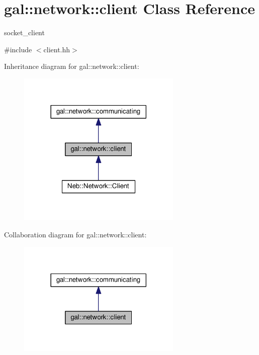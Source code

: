 \hypertarget{classgal_1_1network_1_1client}{\section{gal\-:\-:network\-:\-:client Class Reference}
\label{classgal_1_1network_1_1client}
}


socket\-\_\-client  




{\ttfamily \#include $<$client.\-hh$>$}



Inheritance diagram for gal\-:\-:network\-:\-:client\-:
\nopagebreak
\begin{figure}[H]
\begin{center}
\leavevmode
\includegraphics[width=222pt]{classgal_1_1network_1_1client__inherit__graph}
\end{center}
\end{figure}


Collaboration diagram for gal\-:\-:network\-:\-:client\-:
\nopagebreak
\begin{figure}[H]
\begin{center}
\leavevmode
\includegraphics[width=222pt]{classgal_1_1network_1_1client__coll__graph}
\end{center}
\end{figure}

